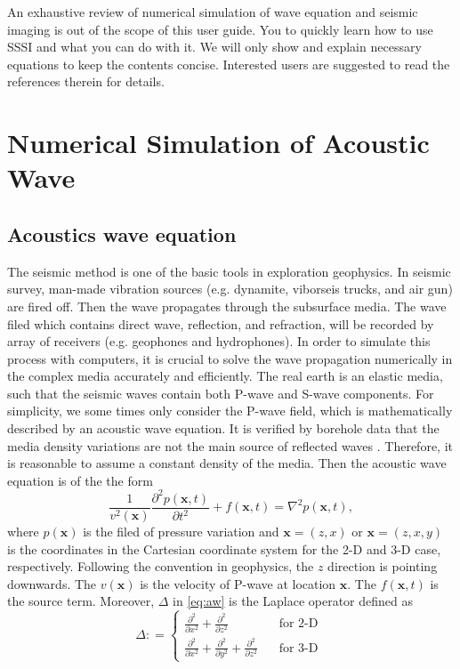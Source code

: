 \documentclass[11pt]{article}
\newcommand{\bx}{\boldsymbol{x}}
\theoremstyle{plain}
\theoremstyle{definition}
\theoremstyle{remark}
\numberwithin{equation}{section}
\begin{document}
An exhaustive review of numerical simulation of wave equation and seismic imaging is out of the scope of this user guide. 
You to quickly learn how to use SSSI and what you can do with it. We will only show and explain necessary 
equations to keep the contents concise. Interested users are suggested to read the references therein for details.  



\section{Numerical Simulation of Acoustic Wave}


\subsection{Acoustics wave equation}
The seismic method is one of the basic tools in exploration geophysics. In seismic survey, man-made vibration sources (e.g. dynamite, viborseis trucks, and air gun) are fired off. Then the wave propagates through the subsurface media. The wave filed which contains direct wave, reflection, and refraction, will be recorded by array of receivers (e.g. geophones and hydrophones). In order to simulate this process with computers, it is crucial to solve the wave propagation numerically in the complex media accurately and efficiently. The real earth is an elastic media, such that the seismic waves contain both P-wave and S-wave components. For simplicity, we some times only consider the P-wave field, which is mathematically described by an acoustic wave equation. It is verified by borehole data that the media density variations are not the main source of reflected waves \cite{Hood:1981aa}. Therefore, it is reasonable to assume a constant density of the media. Then the acoustic wave equation is of the the form  
\begin{equation}\label{eq:aw}
\frac{1}{v^2(\bx)}\frac{\partial^2 p(\bx, t)}{\partial t^2} + f(\bx, t) = \nabla^2 p(\bx, t),
\end{equation}
where $p(\bx)$ is the filed of pressure variation and $\bx=(z,x)$ or $\bx=(z,x,y)$ is the coordinates in the Cartesian coordinate system for the 2-D and 3-D case, respectively. Following the convention in geophysics, the $z$ direction is pointing downwards. The $v(\bx)$ is the velocity of P-wave at location $\bx$. The $f(\bx,t)$ is the source term. Moreover, $\Delta$ in \eqref{eq:aw} is the Laplace operator defined as 
\begin{equation}
\Delta: =\left\{
\begin{aligned}
\frac{\partial^2}{\partial x^2}+\frac{\partial^2}{\partial z^2}~~~~~~~ & ~~~~\text{for 2-D }\\
\frac{\partial^2}{\partial x^2}+\frac{\partial^2}{\partial y^2}+\frac{\partial^2}{\partial z^2} &~~~~ \text{for 3-D}
\end{aligned}
\right.  
\end{equation}
\end{document}

